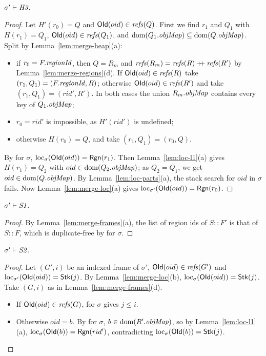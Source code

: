 \begin{lemma}[\inv{H3}] 
$\sigma' \vdash \textit{H3}$.
\end{lemma}
\begin{proof}
Let $H'(r_0) = Q$ and $\mathsf{OId}(oid) \in \mathit{refs}(Q)$. First we find $r_1$ and $Q_1$ with $H(r_1) = Q_1$,
$\mathsf{OId}(oid) \in \mathit{refs}(Q_1)$, and $\mathrm{dom}(Q_1.\mathit{objMap}) \subseteq \mathrm{dom}(Q.\mathit{objMap})$. Split by
Lemma~\ref{lem:merge-heap}(a):
\begin{itemize}[nosep]
  \item if $r_0 = F.\mathit{regionId}$, then $Q = R_m$ and $\mathit{refs}(R_m) = \mathit{refs}(R) \mathbin{+\!\!+} \mathit{refs}(R')$ by
    Lemma~\ref{lem:merge-regions}(d). If $\mathsf{OId}(oid) \in \mathit{refs}(R)$ take $(r_1, Q_1) = (F.\mathit{regionId}, R)$;
    otherwise $\mathsf{OId}(oid) \in \mathit{refs}(R')$ and take $(r_1, Q_1) = (rid', R')$. In both cases the union
    $R_m.\mathit{objMap}$ contains every key of $Q_1.\mathit{objMap}$;
  \item $r_0 = rid'$ is impossible, as $H'(rid')$ is undefined;
  \item otherwise $H(r_0) = Q$, and take $(r_1, Q_1) = (r_0, Q)$.
\end{itemize}
By  for $\sigma$, $\mathrm{loc}_{\sigma}(\mathsf{OId}(oid)) = \mathsf{Rgn}(r_1)$. Then
Lemma~\ref{lem:loc-l1}(a) gives $H(r_1) = Q_2$ with $oid \in \mathrm{dom}(Q_2.\mathit{objMap})$; as $Q_2 = Q_1$, we
get $oid \in \mathrm{dom}(Q.\mathit{objMap})$. By
Lemma~\ref{lem:loc-parts}(a), the stack search for $oid$ in $\sigma$ fails. Now
Lemma~\ref{lem:merge-loc}(a) gives $\mathrm{loc}_{\sigma'}(\mathsf{OId}(oid)) = \mathsf{Rgn}(r_0)$.
\end{proof}

\begin{lemma}[\inv{S1}] 
$\sigma' \vdash \textit{S1}$.
\end{lemma}
\begin{proof}
By Lemma~\ref{lem:merge-frames}(a), the list of region ids of $S :: F'$ is that of $S :: F$, which is
duplicate-free by  for $\sigma$.
\end{proof}

\begin{lemma}[\inv{S2}] 
$\sigma' \vdash \textit{S2}$.
\end{lemma}
\begin{proof}
Let $(G', i)$ be an indexed frame of $\sigma'$, $\mathsf{OId}(oid) \in \mathit{refs}(G')$ and $\mathrm{loc}_{\sigma'}(\mathsf{OId}(oid)) = \mathsf{Stk}(j)$. By
Lemma~\ref{lem:merge-loc}(b), $\mathrm{loc}_{\sigma}(\mathsf{OId}(oid)) = \mathsf{Stk}(j)$. Take $(G, i)$ as in
Lemma~\ref{lem:merge-frames}(d).
\begin{itemize}[nosep]
  \item If $\mathsf{OId}(oid) \in \mathit{refs}(G)$,  for $\sigma$ gives $j \le i$.
  \item Otherwise $oid = b$. By  for $\sigma$, $b \in \mathrm{dom}(R'.\mathit{objMap})$, so by
    Lemma~\ref{lem:loc-l1}(a), $\mathrm{loc}_{\sigma}(\mathsf{OId}(b)) = \mathsf{Rgn}(rid')$, contradicting
    $\mathrm{loc}_{\sigma}(\mathsf{OId}(b)) = \mathsf{Stk}(j)$. \qedhere
\end{itemize}
\end{proof}

